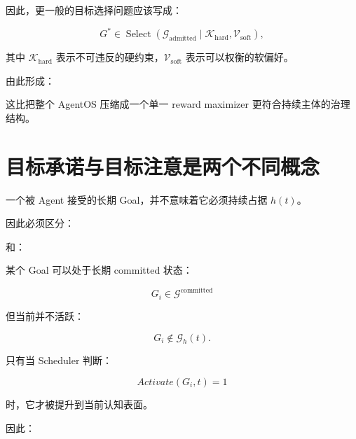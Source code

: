 因此，更一般的目标选择问题应该写成：

\[
\boxed{
G^*
\in
\operatorname{Select}
\left(
\mathcal G_{\mathrm{admitted}}
\mid
\mathcal K_{\mathrm{hard}},
\mathcal V_{\mathrm{soft}}
\right),
}
\]

其中 $\mathcal K_{\mathrm{hard}}$ 表示不可违反的硬约束，$\mathcal V_{\mathrm{soft}}$ 表示可以权衡的软偏好。

由此形成：

\begin{statementbox}
\centering
{}
\end{statementbox}

这比把整个 AgentOS 压缩成一个单一 reward maximizer 更符合持续主体的治理结构。


\section{目标承诺与目标注意是两个不同概念}

一个被 Agent 接受的长期 Goal，并不意味着它必须持续占据 $h(t)$。

因此必须区分：

\begin{statementbox}
\centering
{}
\end{statementbox}

和：

\begin{statementbox}
\centering
{}
\end{statementbox}

某个 Goal 可以处于长期 committed 状态：

\[
G_i\in\mathcal G^{\mathrm{committed}}
\]

但当前并不活跃：

\[
G_i\notin\mathcal G_h(t).
\]

只有当 Scheduler 判断：

\[
Activate(G_i,t)=1
\]

时，它才被提升到当前认知表面。

因此：

\begin{statementbox}
\centering
{}
\end{statementbox}

